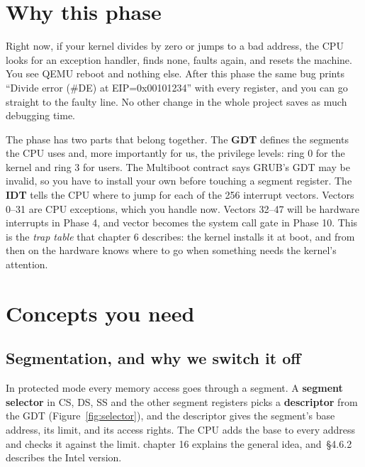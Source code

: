 \documentclass[11pt,a4paper]{article}
\begin{document}


\section{Why this phase}

Right now, if your kernel divides by zero or jumps to a bad address, the CPU looks for an exception handler, finds
none, faults again, and resets the machine. You see QEMU reboot and nothing else. After this phase the same bug
prints ``Divide error (\#DE) at EIP=0x00101234'' with every register, and you can go straight to the faulty line.
No other change in the whole project saves as much debugging time.

The phase has two parts that belong together. The \textbf{GDT} defines the segments the CPU uses and, more
importantly for us, the privilege levels: ring 0 for the kernel and ring 3 for users. The Multiboot contract says
GRUB's GDT may be invalid, so you have to install your own before touching a segment register. The \textbf{IDT} tells
the CPU where to jump for each of the 256 interrupt vectors. Vectors 0--31 are CPU exceptions, which you handle now.
Vectors 32--47 will be hardware interrupts in Phase 4, and vector  becomes the system call gate in
Phase 10. This is the \emph{trap table} that \OSTEP chapter 6 describes: the kernel installs it at boot, and from
then on the hardware knows where to go when something needs the kernel's attention.

\section{Concepts you need}

\subsection{Segmentation, and why we switch it off}

In protected mode every memory access goes through a segment. A \textbf{segment selector} in CS, DS, SS and the
other segment registers picks a \textbf{descriptor} from the GDT (Figure~\ref{fig:selector}), and the descriptor
gives the segment's base address, its limit, and its access rights. The CPU adds the base to every address and checks
it against the limit. \OSTEP chapter 16 explains the general idea, and \OSDI\,\S4.6.2 describes the Intel version.
\end{document}
